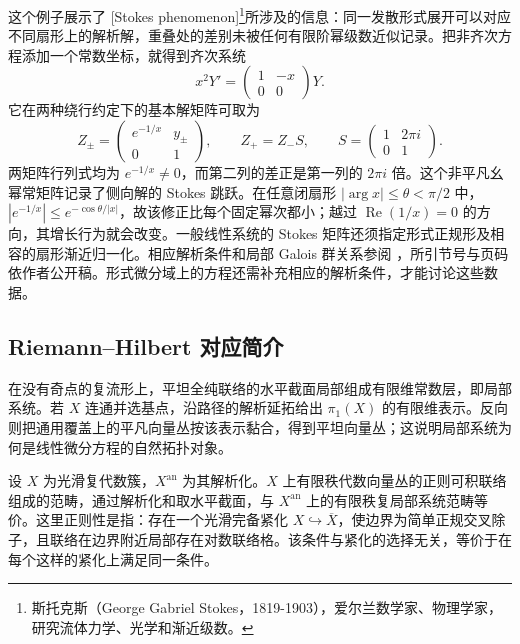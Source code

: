 这个例子展示了 [Stokes phenomenon]\footnote{斯托克斯（George Gabriel Stokes，1819-1903），爱尔兰数学家、物理学家，研究流体力学、光学和渐近级数。}所涉及的信息：同一发散形式展开可以对应不同扇形上的解析解，重叠处的差别未被任何有限阶幂级数近似记录。把非齐次方程添加一个常数坐标，就得到齐次系统
\[
	x^2Y'=\begin{pmatrix}1&-x\\0&0\end{pmatrix}Y.
\]
它在两种绕行约定下的基本解矩阵可取为
\[
	Z_\pm=\begin{pmatrix}e^{-1/x}&y_\pm\\0&1\end{pmatrix},
	\qquad Z_+=Z_-S,\qquad
	S=\begin{pmatrix}1&2\pi i\\0&1\end{pmatrix}.
\]
两矩阵行列式均为 \(e^{-1/x}\ne0\)，而第二列的差正是第一列的 \(2\pi i\) 倍。这个非平凡幺幂常矩阵记录了侧向解的 Stokes 跳跃。在任意闭扇形 \(|\arg x|\le\theta<\pi/2\) 中，\(|e^{-1/x}|\le e^{-\cos\theta/|x|}\)，故该修正比每个固定幂次都小；越过 \(\operatorname{Re}(1/x)=0\) 的方向，其增长行为就会改变。一般线性系统的 Stokes 矩阵还须指定形式正规形及相容的扇形渐近归一化。相应解析条件和局部 Galois 群关系参阅 \cite[Section 1.4, pp. 35--38]{Singer2009DifferentialGalois}，所引节号与页码依作者公开稿。形式微分域上的方程还需补充相应的解析条件，才能讨论这些数据。

\subsection{Riemann–Hilbert 对应简介}
\label{b5:subsec:D02:03}

在没有奇点的复流形上，平坦全纯联络的水平截面局部组成有限维常数层，即局部系统。若 \(X\) 连通并选基点，沿路径的解析延拓给出 \(\pi_1(X)\) 的有限维表示。反向则把通用覆盖上的平凡向量丛按该表示黏合，得到平坦向量丛；这说明局部系统为何是线性微分方程的自然拓扑对象。

\begin{theorem}\label{b5:thm:D-rh-connections}
	设 \(X\) 为光滑复代数簇，\(X^{\mathrm{an}}\) 为其解析化。\(X\) 上有限秩代数向量丛的正则可积联络组成的范畴，通过解析化和取水平截面，与 \(X^{\mathrm{an}}\) 上的有限秩复局部系统范畴等价。这里正则性是指：存在一个光滑完备紧化 \(X\hookrightarrow\overline X\)，使边界为简单正规交叉除子，且联络在边界附近局部存在对数联络格。该条件与紧化的选择无关，等价于在每个这样的紧化上满足同一条件。
\end{theorem}

